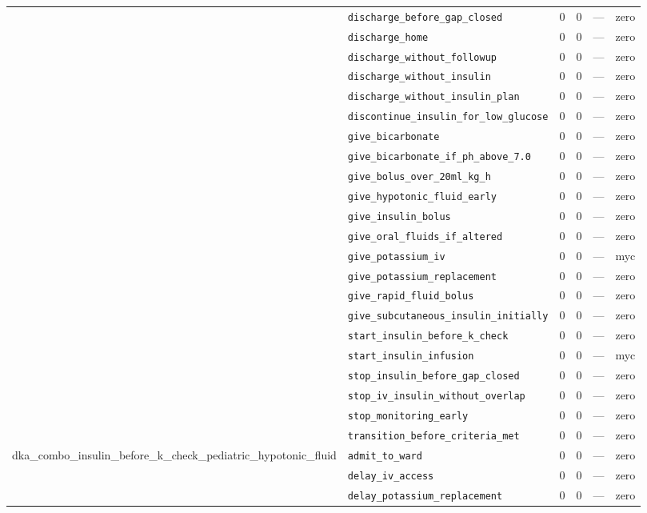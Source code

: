 \begin{table}[ht]
\begin{tabular}{llrrrl}
 & \texttt{discharge\_before\_gap\_closed} & 0 & 0 & — & zero \\
 & \texttt{discharge\_home} & 0 & 0 & — & zero \\
 & \texttt{discharge\_without\_followup} & 0 & 0 & — & zero \\
 & \texttt{discharge\_without\_insulin} & 0 & 0 & — & zero \\
 & \texttt{discharge\_without\_insulin\_plan} & 0 & 0 & — & zero \\
 & \texttt{discontinue\_insulin\_for\_low\_glucose} & 0 & 0 & — & zero \\
 & \texttt{give\_bicarbonate} & 0 & 0 & — & zero \\
 & \texttt{give\_bicarbonate\_if\_ph\_above\_7.0} & 0 & 0 & — & zero \\
 & \texttt{give\_bolus\_over\_20ml\_kg\_h} & 0 & 0 & — & zero \\
 & \texttt{give\_hypotonic\_fluid\_early} & 0 & 0 & — & zero \\
 & \texttt{give\_insulin\_bolus} & 0 & 0 & — & zero \\
 & \texttt{give\_oral\_fluids\_if\_altered} & 0 & 0 & — & zero \\
 & \texttt{give\_potassium\_iv} & 0 & 0 & — & myc \\
 & \texttt{give\_potassium\_replacement} & 0 & 0 & — & zero \\
 & \texttt{give\_rapid\_fluid\_bolus} & 0 & 0 & — & zero \\
 & \texttt{give\_subcutaneous\_insulin\_initially} & 0 & 0 & — & zero \\
 & \texttt{start\_insulin\_before\_k\_check} & 0 & 0 & — & zero \\
 & \texttt{start\_insulin\_infusion} & 0 & 0 & — & myc \\
 & \texttt{stop\_insulin\_before\_gap\_closed} & 0 & 0 & — & zero \\
 & \texttt{stop\_iv\_insulin\_without\_overlap} & 0 & 0 & — & zero \\
 & \texttt{stop\_monitoring\_early} & 0 & 0 & — & zero \\
 & \texttt{transition\_before\_criteria\_met} & 0 & 0 & — & zero \\
\midrule
dka\_combo\_insulin\_before\_k\_check\_pediatric\_hypotonic\_fluid & \texttt{admit\_to\_ward} & 0 & 0 & — & zero \\
 & \texttt{delay\_iv\_access} & 0 & 0 & — & zero \\
 & \texttt{delay\_potassium\_replacement} & 0 & 0 & — & zero \\

\end{tabular}
\end{table}
